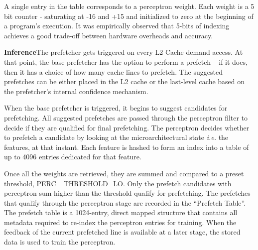 
A single entry in the table corresponds to a perceptron weight.  Each
weight is a 5 bit counter - saturating at -16 and +15 and initialized
to zero at the beginning of a program's execution. It was empirically 
observed that 5-bits of indexing achieves a good trade-off between 
hardware overheads and accuracy. 

\textbf{Inference}\newline The prefetcher gets triggered on every 
L2 Cache demand access.  At
that point, the base prefetcher has the option to perform a prefetch
-- if it does, then it has a choice of how many cache lines to
prefetch.  The suggested prefetches can be either placed in the L2
cache or the last-level cache based on the prefetcher's internal
confidence mechanism.


When the base prefetcher is triggered, it begins to suggest candidates
for prefetching.  All suggested prefetches are passed through the
perceptron filter to decide if they are qualified for final
prefetching.  The perceptron decides whether to prefetch a candidate
by looking at the microarchitectural state \textit{i.e.} the features,
at that instant.  Each feature is hashed to form an index into a table
of up to 4096 entries dedicated for that feature.

Once all the weights are retrieved, they are summed and compared to a
preset threshold, PERC\_ THRESHOLD\_LO.  Only the prefetch candidates
with perceptron sum higher than the threshold qualify for prefetching.
The prefetches that qualify through the perceptron stage are recorded
in the ``Prefetch Table''. The prefetch table is a 1024-entry, direct
mapped structure that contains all metadata required to re-index the 
perceptron entries for training.  
When the feedback of the current prefetched line is available at a
later stage, the stored data is used to train the perceptron.

